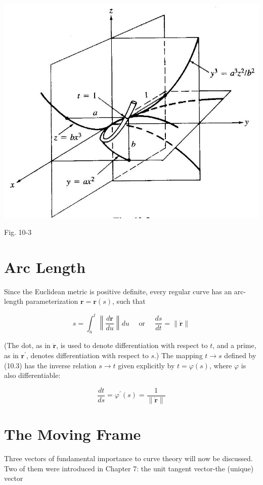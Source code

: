 \documentclass[10pt]{article}
\begin{document}
\begin{center}
\includegraphics[max width=\textwidth]{2024_04_03_41f90be4f896e21f0dc9g-137(1)}
\end{center}

Fig. 10-3

\section*{Arc Length}
Since the Euclidean metric is positive definite, every regular curve has an arc-length parameterization $\mathbf{r}=\mathbf{r}(s)$, such that


\begin{equation*}
s=\int_{a}^{t}\left\|\frac{d \mathbf{r}}{d u}\right\| d u \quad \text { or } \quad \frac{d s}{d t}=\|\dot{\mathbf{r}}\| \tag{10.3}
\end{equation*}


(The dot, as in $\dot{\mathbf{r}}$, is used to denote differentiation with respect to $t$, and a prime, as in $\mathbf{r}^{\prime}$, denotes differentiation with respect to $s$.) The mapping $t \rightarrow s$ defined by (10.3) has the inverse relation $s \rightarrow t$ given explicitly by $t=\varphi(s)$, where $\varphi$ is also differentiable:


\begin{equation*}
\frac{d t}{d s}=\varphi^{\prime}(s)=\frac{1}{\|\dot{\mathbf{r}}\|} \tag{10.4}
\end{equation*}


\section*{The Moving Frame}
Three vectors of fundamental importance to curve theory will now be discussed. Two of them were introduced in Chapter 7: the unit tangent vector-the (unique) vector
\end{document}
